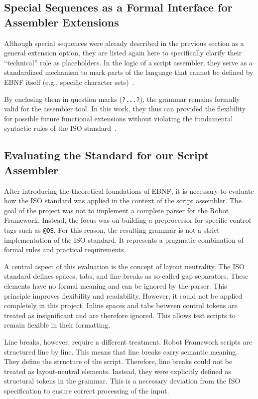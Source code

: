 \subsection{Special Sequences as a Formal Interface for Assembler Extensions}

Although special sequences were already described in the previous section as a general extension option, they are listed again here to specifically clarify their ``technical'' role as placeholders. In the logic of a script assembler, they serve as a standardized mechanism to mark parts of the language that cannot be defined by EBNF itself (e.g., specific character sets)~\cite[p.~VII]{ISO/IEC149771996InformationBNF}.

By enclosing them in question marks (\texttt{?...?}), the grammar remains formally valid for the assembler tool. In this work, they thus can provided the flexibility for possible future functional extensions without violating the fundamental syntactic rules of the ISO standard~\cite[p.~3]{ISO/IEC149771996InformationBNF}.


\subsection{Evaluating the Standard for our Script Assembler}

After introducing the theoretical foundations of EBNF, it is necessary to evaluate how the ISO standard was applied in the context of the script assembler. The goal of the project was not to implement a complete parser for the Robot Framework. Instead, the focus was on building a preprocessor for specific control tags such as \texttt{@OS}. For this reason, the resulting grammar is not a strict implementation of the ISO standard. It represents a pragmatic combination of formal rules and practical requirements.

A central aspect of this evaluation is the concept of layout neutrality. The ISO standard defines spaces, tabs, and line breaks as so-called gap separators. These elements have no formal meaning and can be ignored by the parser. This principle improves flexibility and readability. However, it could not be applied completely in this project. Inline spaces and tabs between control tokens are treated as insignificant and are therefore ignored. This allows test scripts to remain flexible in their formatting.

Line breaks, however, require a different treatment. Robot Framework scripts are structured line by line. This means that line breaks carry semantic meaning. They define the structure of the script. Therefore, line breaks could not be treated as layout-neutral elements. Instead, they were explicitly defined as structural tokens in the grammar. This is a necessary deviation from the ISO specification to ensure correct processing of the input.


